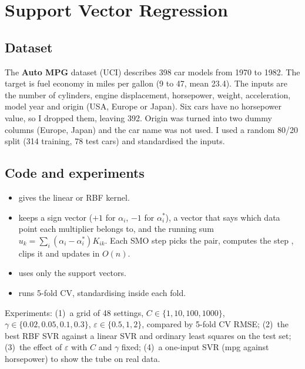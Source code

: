 \chapter{Support Vector Regression}


\section{Dataset}
The \textbf{Auto MPG} dataset (UCI) describes 398 car models from 1970 to 1982. The target is fuel
economy in miles per gallon (9 to 47, mean 23.4). The inputs are the number of cylinders, engine
displacement, horsepower, weight, acceleration, model year and origin (USA, Europe or Japan). Six cars
have no horsepower value, so I dropped them, leaving 392. Origin was turned into two dummy columns
(Europe, Japan) and the car name was not used. I used a random 80/20 split (314 training, 78 test cars)
and standardised the inputs.

\section{Code and experiments}
\begin{itemize}
\item {} gives the linear or RBF kernel.
\item {} keeps a sign vector  ($+1$ for $\alpha_i$, $-1$ for $\alpha_i^*$), a vector
       that says which data point each multiplier belongs to, and the running sum
      $u_k=\sum_i(\alpha_i-\alpha_i^*)K_{ik}$. Each SMO step picks the pair, computes the step ,
      clips it and updates  in $O(n)$.
\item {} uses only the support vectors.
\item {} runs 5-fold CV, standardising inside each fold.
\end{itemize}
\noindent Experiments: (1)~a grid of 48 settings, $C\in\{1,10,100,1000\}$, $\gamma\in\{0.02,0.05,0.1,0.3\}$,
$\varepsilon\in\{0.5,1,2\}$, compared by 5-fold CV RMSE; (2)~the best RBF SVR against a linear SVR and
ordinary least squares on the test set; (3)~the effect of $\varepsilon$ with $C$ and $\gamma$ fixed;
(4)~a one-input SVR (mpg against horsepower) to show the tube on real data.

